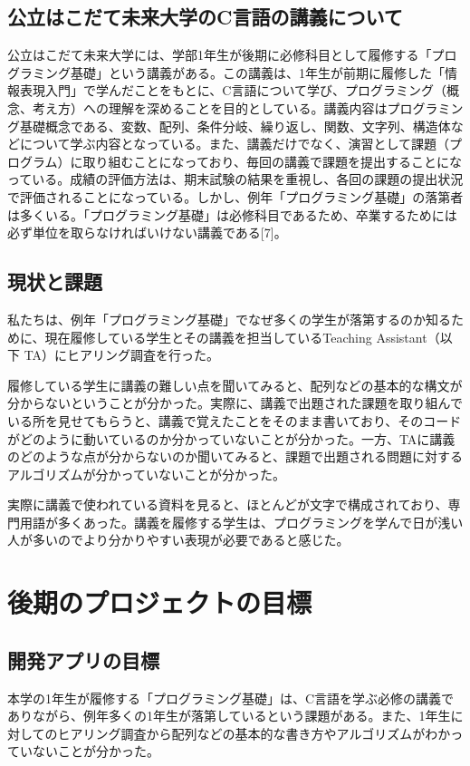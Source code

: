 \documentclass[openany,11pt,papersize]{jsbook}
\begin{document}
\section{公立はこだて未来大学のC言語の講義について}
\par 公立はこだて未来大学には、学部1年生が後期に必修科目として履修する「プログラミング基礎」という講義がある。この講義は、1年生が前期に履修した「情報表現入門」で学んだことをもとに、C言語について学び、プログラミング（概念、考え方）への理解を深めることを目的としている。講義内容はプログラミング基礎概念である、変数、配列、条件分岐、繰り返し、関数、文字列、構造体などについて学ぶ内容となっている。また、講義だけでなく、演習として課題（プログラム）に取り組むことになっており、毎回の講義で課題を提出することになっている。成績の評価方法は、期末試験の結果を重視し、各回の課題の提出状況で評価されることになっている。しかし、例年「プログラミング基礎」の落第者は多くいる。「プログラミング基礎」は必修科目であるため、卒業するためには必ず単位を取らなければいけない講義である[7]。

\section{現状と課題}
\par 私たちは、例年「プログラミング基礎」でなぜ多くの学生が落第するのか知るために、現在履修している学生とその講義を担当しているTeaching Assistant（以下 TA）にヒアリング調査を行った。
\par 履修している学生に講義の難しい点を聞いてみると、配列などの基本的な構文が分からないということが分かった。実際に、講義で出題された課題を取り組んでいる所を見せてもらうと、講義で覚えたことをそのまま書いており、そのコードがどのように動いているのか分かっていないことが分かった。一方、TAに講義のどのような点が分からないのか聞いてみると、課題で出題される問題に対するアルゴリズムが分かっていないことが分かった。
\par 実際に講義で使われている資料を見ると、ほとんどが文字で構成されており、専門用語が多くあった。講義を履修する学生は、プログラミングを学んで日が浅い人が多いのでより分かりやすい表現が必要であると感じた。



\chapter{後期のプロジェクトの目標}

\section{開発アプリの目標}
本学の1年生が履修する「プログラミング基礎」は、C言語を学ぶ必修の講義でありながら、例年多くの1年生が落第しているという課題がある。また、1年生に対してのヒアリング調査から配列などの基本的な書き方やアルゴリズムがわかっていないことが分かった。
\end{document}
